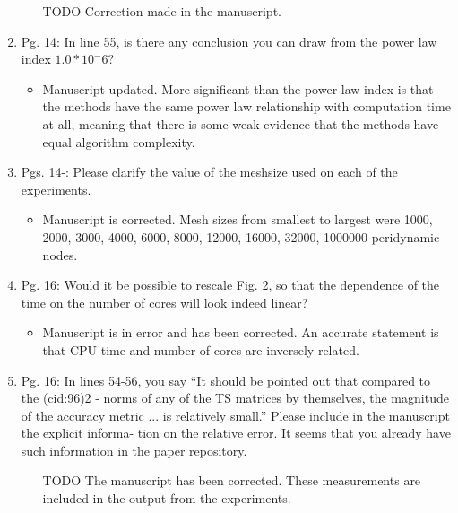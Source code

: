 \documentclass{article}
\begin{document}
\begin{enumerate}
{\color{red}  
\begin{itemize}
    \item
        [TODO]
        Correction made in the manuscript. 
  \end{itemize}}

  \item
    Pg. 14: In line 55, is there any conclusion you can draw from the power law index
    $1.0 * 10^-6$?

{\color{red}  
\begin{itemize}
     \item
      Manuscript updated. More significant than the power law index is that the methods have the same power law relationship with computation time at all, meaning that there is some weak evidence that the methods have equal algorithm complexity. 
  \end{itemize}}

  \item
    Pgs. 14-: Please clarify the value of the meshsize used on each of the experiments.

{\color{red}  
\begin{itemize}
     \item
         Manuscript is corrected. Mesh sizes from smallest to largest were 1000, 2000, 3000, 4000, 6000, 8000, 12000,
         16000, 32000, 1000000 peridynamic nodes.
      \end{itemize}}

  \item
    Pg. 16: Would it be possible to rescale Fig. 2, so that the dependence of the time
    on the number of cores will look indeed linear?

{\color{red}  
\begin{itemize}
     \item
     Manuscript is in error and has been corrected. An accurate statement is that CPU time and number of cores are inversely related.
  \end{itemize}}

  \item
    Pg. 16: In lines 54-56, you say “It should be pointed out that compared to the (cid:96)2 -
    norms of any of the TS matrices by themselves, the magnitude of the accuracy
    metric ... is relatively small.” Please include in the manuscript the explicit informa-
    tion on the relative error. It seems that you already have such information in the
    paper repository.

{\color{red}  
\begin{itemize}
     \item
[TODO]
    The manuscript has been corrected. These measurements are included in the output from the experiments.
    \end{itemize}}


\end{enumerate}
\end{document}
